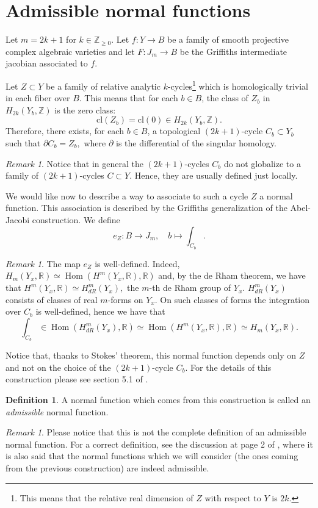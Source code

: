 \documentclass[a4paper,12 pt,titlepage,twoside]{book}
\newcommand{\numberset}{\mathbb}
\newcommand{\Z}{\numberset{Z}}
\newcommand{\R}{\numberset{R}}
\DeclareMathOperator{\Hom}{Hom}
\theoremstyle{plain}
\theoremstyle{theorem}
\theoremstyle{definition}
\newtheorem{defn}[thm]{Definition}
\theoremstyle{remark}
\newtheorem{oss}[thm]{Remark}
\begin{document}
	\section{Admissible normal functions}
	Let $m = 2k+1$ for $k \in \Z_{\ge 0}$. Let $f \colon Y \rightarrow B$ be a family of smooth projective complex algebraic varieties and let $F \colon J_m \rightarrow B$ be the Griffiths intermediate jacobian associated to $f$. 
	
	Let $Z \subset Y$ be a family of relative analytic $k$-cycles\footnote{This means that the relative real dimension of $Z$ with respect to $Y$ is $2k$.} which is homologically trivial in each fiber over $B$. This means that for each $b \in B$, the class of $Z_b$  in $H_{2k}(Y_b,\Z)$ is the zero class: $$\text{cl}(Z_b)= \text{cl}(0) \in H_{2k}(Y_b, \Z).$$ Therefore, there exists, for each $b \in B$, a topological $(2k+1)$-cycle $C_b \subset Y_b$ such that $\partial C_b =Z_b, $ where $\partial$ is the differential of the singular homology.
	\begin{oss}
		Notice that in general the $(2k+1)$-cycles $C_b$ do not globalize to a family of $(2k+1)$-cycles $C \subset Y$. Hence, they are usually defined just locally.
	\end{oss}
	We would like now to describe a way to associate to such a cycle $Z$ a normal function. This association is described by the Griffiths generalization of the Abel-Jacobi construction. We define $$e_Z \colon B \rightarrow J_m, \quad b \mapsto \int_{C_b}.$$
	\begin{oss}
		The map $e_Z$ is well-defined. Indeed, $H_m(Y_x, \R) \simeq \Hom(H^m(Y_x,\R), \R)$ and, by the de Rham theorem, we have that $H^m(Y_x,\R) \simeq H^m_{dR}(Y_x),$ the $m$-th de Rham group of $Y_x$. $H^m_{dR}(Y_x)$ consists of classes of real $m$-forms on $Y_x.$ On such classes of forms the integration over $C_b$ is well-defined, hence we have that $$\int_{C_b} \in \Hom(H^m_{dR}(Y_x), \R) \simeq \Hom(H^m(Y_x,\R),\R) \simeq H_m(Y_x,\R).$$
	\end{oss} 
	Notice that, thanks to Stokes' theorem, this normal function depends only on $Z$ and not on the choice of the $(2k+1)$-cycle $C_b$. For the details of this construction please see section 5.1 of \cite{MR3184171}.
	\begin{defn}
		A normal function which comes from this construction is called an \emph{admissible} normal function.
	\end{defn}
	\begin{oss}
		Please notice that this is not the complete definition of an admissible normal function. For a correct definition, see the discussion at page 2 of \cite{MR3983292}, where it is also said that the normal functions which we will consider (the ones coming from the previous construction) are indeed admissible. 
	\end{oss}
\end{document}
